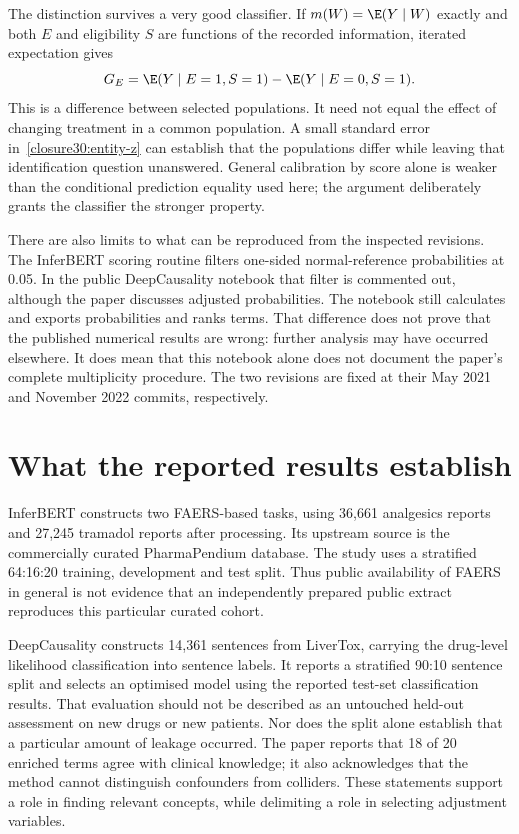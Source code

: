 The distinction survives a very good classifier. If
$m(W)=\E(Y\mid W)$ exactly and both $E$ and eligibility $S$ are functions
of the recorded information, iterated expectation gives
\begin{equation}
 G_E=\E(Y\mid E=1,S=1)-\E(Y\mid E=0,S=1).
 \label{closure30:calibration-group}
\end{equation}
This is a difference between selected populations. It need not equal the
effect of changing treatment in a common population. A small standard error
in~\eqref{closure30:entity-z} can establish that the populations differ while
leaving that identification question unanswered. General calibration by
score alone is weaker than the conditional prediction equality used here;
the argument deliberately grants the classifier the stronger property.

There are also limits to what can be reproduced from the inspected revisions.
The InferBERT scoring routine filters one-sided normal-reference probabilities
at 0.05. In the public DeepCausality notebook that filter is commented out,
although the paper discusses adjusted probabilities. The notebook still
calculates and exports probabilities and ranks terms. That difference does
not prove that the published numerical results are wrong: further analysis
may have occurred elsewhere. It does mean that this notebook alone does not
document the paper's complete multiplicity procedure. The two revisions are
fixed at their May 2021 and November 2022 commits, respectively.
\citep{closure30inferbertcode,closure30deepcausalitycode}

\section{What the reported results establish}

InferBERT constructs two FAERS-based tasks, using 36,661 analgesics reports
and 27,245 tramadol reports after processing. Its upstream source is the
commercially curated PharmaPendium database. The study uses a stratified
64:16:20 training, development and test split. Thus public availability of
FAERS in general is not evidence that an independently prepared public
extract reproduces this particular curated cohort.
\citep[pp.~3--4, Table 1]{closure30inferbert}

DeepCausality constructs 14,361 sentences from LiverTox, carrying the
drug-level likelihood classification into sentence labels. It reports a
stratified 90:10 sentence split and selects an optimised model using the
reported test-set classification results. That evaluation should not be
described as an untouched held-out assessment on new drugs or new patients.
Nor does the split alone establish that a particular amount of leakage
occurred. The paper reports that 18 of 20 enriched terms agree with clinical
knowledge; it also acknowledges that the method cannot distinguish
confounders from colliders. These statements support a role in finding
relevant concepts, while delimiting a role in selecting adjustment variables.
\citep[pp.~5--8, Table 1; pp.~9--11, Table 2 and Discussion]
{closure30deepcausality}

